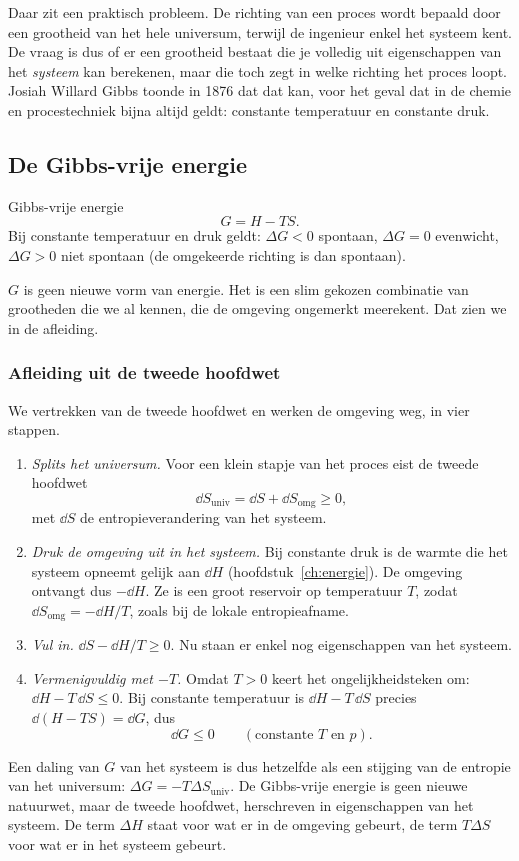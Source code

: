 Daar zit een praktisch probleem. De richting van een proces wordt bepaald door een grootheid van het hele universum, terwijl de ingenieur enkel het systeem kent. De vraag is dus of er een grootheid bestaat die je volledig uit eigenschappen van het \emph{systeem} kan berekenen, maar die toch zegt in welke richting het proces loopt. Josiah Willard Gibbs toonde in 1876 dat dat kan, voor het geval dat in de chemie en procestechniek bijna altijd geldt: constante temperatuur en constante druk.

\subsection{De Gibbs-vrije energie}

\begin{definitie}{Gibbs-vrije energie}
\begin{equation}
G = H - TS.
\end{equation}
Bij constante temperatuur en druk geldt: $\Delta G < 0$ spontaan, $\Delta G = 0$ evenwicht, $\Delta G > 0$ niet spontaan (de omgekeerde richting is dan spontaan).
\end{definitie}

$G$ is geen nieuwe vorm van energie. Het is een slim gekozen combinatie van grootheden die we al kennen, die de omgeving ongemerkt meerekent. Dat zien we in de afleiding.

\subsubsection{Afleiding uit de tweede hoofdwet}

We vertrekken van de tweede hoofdwet en werken de omgeving weg, in vier stappen.
\begin{enumerate}
\item \emph{Splits het universum.} Voor een klein stapje van het proces eist de tweede hoofdwet
\[
\dd S_\text{univ} = \dd S + \dd S_\text{omg} \geq 0,
\]
met $\dd S$ de entropieverandering van het systeem.
\item \emph{Druk de omgeving uit in het systeem.} Bij constante druk is de warmte die het systeem opneemt gelijk aan $\dd H$ (hoofdstuk~\ref{ch:energie}). De omgeving ontvangt dus $-\dd H$. Ze is een groot reservoir op temperatuur $T$, zodat $\dd S_\text{omg} = -\dd H/T$, zoals bij de lokale entropieafname.
\item \emph{Vul in.} $\dd S - \dd H/T \geq 0$. Nu staan er enkel nog eigenschappen van het systeem.
\item \emph{Vermenigvuldig met $-T$.} Omdat $T > 0$ keert het ongelijkheidsteken om: $\dd H - T\,\dd S \leq 0$. Bij constante temperatuur is $\dd H - T\,\dd S$ precies $\dd(H - TS) = \dd G$, dus
\[
\dd G \leq 0 \qquad (\text{constante } T \text{ en } p).
\]
\end{enumerate}
Een daling van $G$ van het systeem is dus hetzelfde als een stijging van de entropie van het universum: $\Delta G = -T\Delta S_\text{univ}$. De Gibbs-vrije energie is geen nieuwe natuurwet, maar de tweede hoofdwet, herschreven in eigenschappen van het systeem. De term $\Delta H$ staat voor wat er in de omgeving gebeurt, de term $T\Delta S$ voor wat er in het systeem gebeurt.

